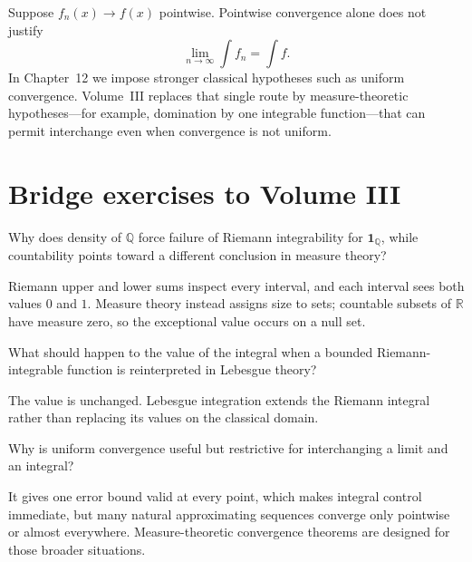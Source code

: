 \begin{example}\label{ex:ii10-lebesgue-bridge-02}
Suppose \(f_n(x)\to f(x)\) pointwise. Pointwise convergence alone does not justify
\[
\lim_{n\to\infty}\int f_n=\int f.
\]
In Chapter~12 we impose stronger classical hypotheses such as uniform convergence. Volume~III replaces that single route by measure-theoretic hypotheses---for example, domination by one integrable function---that can permit interchange even when convergence is not uniform.
\end{example}

\section{Bridge exercises to Volume III}
\begin{exercise}\label{exr:ii10-lebesgue-bridge-01}
Why does density of \(\mathbb Q\) force failure of Riemann integrability for \(\mathbf 1_{\mathbb Q}\), while countability points toward a different conclusion in measure theory?
\end{exercise}
\begin{solution}
Riemann upper and lower sums inspect every interval, and each interval sees both values \(0\) and \(1\). Measure theory instead assigns size to sets; countable subsets of \(\mathbb R\) have measure zero, so the exceptional value occurs on a null set.
\end{solution}

\begin{exercise}\label{exr:ii10-lebesgue-bridge-02}
What should happen to the value of the integral when a bounded Riemann-integrable function is reinterpreted in Lebesgue theory?
\end{exercise}
\begin{solution}
The value is unchanged. Lebesgue integration extends the Riemann integral rather than replacing its values on the classical domain.
\end{solution}

\begin{exercise}\label{exr:ii10-lebesgue-bridge-03}
Why is uniform convergence useful but restrictive for interchanging a limit and an integral?
\end{exercise}
\begin{solution}
It gives one error bound valid at every point, which makes integral control immediate, but many natural approximating sequences converge only pointwise or almost everywhere. Measure-theoretic convergence theorems are designed for those broader situations.
\end{solution}

